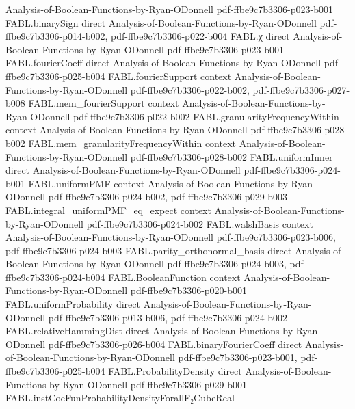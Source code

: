 \begin{theorem}
  {Analysis-of-Boolean-Functions-by-Ryan-ODonnell}
  {pdf-ffbe9c7b3306-p023-b001}
\proofstep
  {FABL.binarySign}
  {direct}
  {Analysis-of-Boolean-Functions-by-Ryan-ODonnell}
  {pdf-ffbe9c7b3306-p014-b002,
    pdf-ffbe9c7b3306-p022-b004}
\proofstep
  {FABL.χ}
  {direct}
  {Analysis-of-Boolean-Functions-by-Ryan-ODonnell}
  {pdf-ffbe9c7b3306-p023-b001}
\proofstep
  {FABL.fourierCoeff}
  {direct}
  {Analysis-of-Boolean-Functions-by-Ryan-ODonnell}
  {pdf-ffbe9c7b3306-p025-b004}
\proofstep
  {FABL.fourierSupport}
  {context}
  {Analysis-of-Boolean-Functions-by-Ryan-ODonnell}
  {pdf-ffbe9c7b3306-p022-b002,
    pdf-ffbe9c7b3306-p027-b008}
\proofstep
  {FABL.mem_fourierSupport}
  {context}
  {Analysis-of-Boolean-Functions-by-Ryan-ODonnell}
  {pdf-ffbe9c7b3306-p022-b002}
\proofstep
  {FABL.granularityFrequencyWithin}
  {context}
  {Analysis-of-Boolean-Functions-by-Ryan-ODonnell}
  {pdf-ffbe9c7b3306-p028-b002}
\proofstep
  {FABL.mem_granularityFrequencyWithin}
  {context}
  {Analysis-of-Boolean-Functions-by-Ryan-ODonnell}
  {pdf-ffbe9c7b3306-p028-b002}
\proofstep
  {FABL.uniformInner}
  {direct}
  {Analysis-of-Boolean-Functions-by-Ryan-ODonnell}
  {pdf-ffbe9c7b3306-p024-b001}
\proofstep
  {FABL.uniformPMF}
  {context}
  {Analysis-of-Boolean-Functions-by-Ryan-ODonnell}
  {pdf-ffbe9c7b3306-p024-b002,
    pdf-ffbe9c7b3306-p029-b003}
\proofstep
  {FABL.integral_uniformPMF_eq_expect}
  {context}
  {Analysis-of-Boolean-Functions-by-Ryan-ODonnell}
  {pdf-ffbe9c7b3306-p024-b002}
\proofstep
  {FABL.walshBasis}
  {context}
  {Analysis-of-Boolean-Functions-by-Ryan-ODonnell}
  {pdf-ffbe9c7b3306-p023-b006,
    pdf-ffbe9c7b3306-p024-b003}
\proofstep
  {FABL.parity_orthonormal_basis}
  {direct}
  {Analysis-of-Boolean-Functions-by-Ryan-ODonnell}
  {pdf-ffbe9c7b3306-p024-b003,
    pdf-ffbe9c7b3306-p024-b004}
\proofstep
  {FABL.BooleanFunction}
  {context}
  {Analysis-of-Boolean-Functions-by-Ryan-ODonnell}
  {pdf-ffbe9c7b3306-p020-b001}
\proofstep
  {FABL.uniformProbability}
  {direct}
  {Analysis-of-Boolean-Functions-by-Ryan-ODonnell}
  {pdf-ffbe9c7b3306-p013-b006,
    pdf-ffbe9c7b3306-p024-b002}
\proofstep
  {FABL.relativeHammingDist}
  {direct}
  {Analysis-of-Boolean-Functions-by-Ryan-ODonnell}
  {pdf-ffbe9c7b3306-p026-b004}
\proofstep
  {FABL.binaryFourierCoeff}
  {direct}
  {Analysis-of-Boolean-Functions-by-Ryan-ODonnell}
  {pdf-ffbe9c7b3306-p023-b001,
    pdf-ffbe9c7b3306-p025-b004}
\proofstep
  {FABL.ProbabilityDensity}
  {direct}
  {Analysis-of-Boolean-Functions-by-Ryan-ODonnell}
  {pdf-ffbe9c7b3306-p029-b001}
\proofstep
  {FABL.instCoeFunProbabilityDensityForallF₂CubeReal}

\end{theorem}
